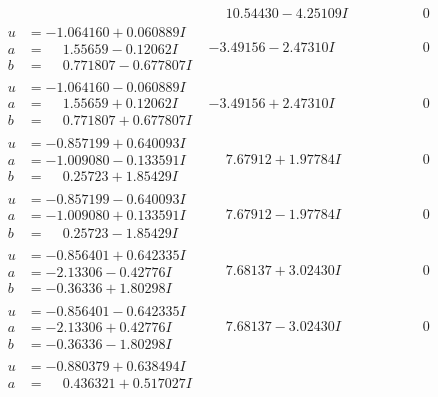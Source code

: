 \documentclass[1p]{elsarticle_modified}
\theoremstyle{definition}
\begin{document}
$$\begin{array}{c|c|c}
 & \phantom{-}10.54430 - 4.25109 I & \phantom{-0.000000 } 0 \\ \hline\begin{aligned}
u &= -1.064160 + 0.060889 I \\
a &= \phantom{-}1.55659 - 0.12062 I \\
b &= \phantom{-}0.771807 - 0.677807 I\end{aligned}
 & -3.49156 - 2.47310 I & \phantom{-0.000000 } 0 \\ \hline\begin{aligned}
u &= -1.064160 - 0.060889 I \\
a &= \phantom{-}1.55659 + 0.12062 I \\
b &= \phantom{-}0.771807 + 0.677807 I\end{aligned}
 & -3.49156 + 2.47310 I & \phantom{-0.000000 } 0 \\ \hline\begin{aligned}
u &= -0.857199 + 0.640093 I \\
a &= -1.009080 - 0.133591 I \\
b &= \phantom{-}0.25723 + 1.85429 I\end{aligned}
 & \phantom{-}7.67912 + 1.97784 I & \phantom{-0.000000 } 0 \\ \hline\begin{aligned}
u &= -0.857199 - 0.640093 I \\
a &= -1.009080 + 0.133591 I \\
b &= \phantom{-}0.25723 - 1.85429 I\end{aligned}
 & \phantom{-}7.67912 - 1.97784 I & \phantom{-0.000000 } 0 \\ \hline\begin{aligned}
u &= -0.856401 + 0.642335 I \\
a &= -2.13306 - 0.42776 I \\
b &= -0.36336 + 1.80298 I\end{aligned}
 & \phantom{-}7.68137 + 3.02430 I & \phantom{-0.000000 } 0 \\ \hline\begin{aligned}
u &= -0.856401 - 0.642335 I \\
a &= -2.13306 + 0.42776 I \\
b &= -0.36336 - 1.80298 I\end{aligned}
 & \phantom{-}7.68137 - 3.02430 I & \phantom{-0.000000 } 0 \\ \hline\begin{aligned}
u &= -0.880379 + 0.638494 I \\
a &= \phantom{-}0.436321 + 0.517027 I \\

\end{aligned}
\end{array}$$
\end{document}
